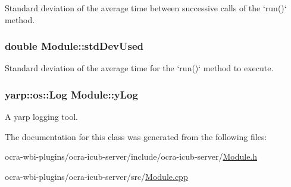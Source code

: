 \-Standard deviation of the average time between successive calls of the `run()` method. \hypertarget{classModule_a57060f2788b6dc9906e66432e775e5ac}{
\subsubsection[{std\-Dev\-Used}]{\setlength{\rightskip}{0pt plus 5cm}double {\bf \-Module\-::std\-Dev\-Used}}}\label{classModule_a57060f2788b6dc9906e66432e775e5ac}
\-Standard deviation of the average time for the `run()` method to execute. \hypertarget{classModule_ae029b50069bf4ff53a6f69a5bae824f6}{
\subsubsection[{y\-Log}]{\setlength{\rightskip}{0pt plus 5cm}yarp\-::os\-::\-Log {\bf \-Module\-::y\-Log}}}\label{classModule_ae029b50069bf4ff53a6f69a5bae824f6}
\-A yarp logging tool. 

\-The documentation for this class was generated from the following files\-:\begin{DoxyCompactItemize}
\item 
ocra-\/wbi-\/plugins/ocra-\/icub-\/server/include/ocra-\/icub-\/server/\hyperlink{Module_8h}{\-Module.\-h}\item 
ocra-\/wbi-\/plugins/ocra-\/icub-\/server/src/\hyperlink{Module_8cpp}{\-Module.\-cpp}\end{DoxyCompactItemize}
